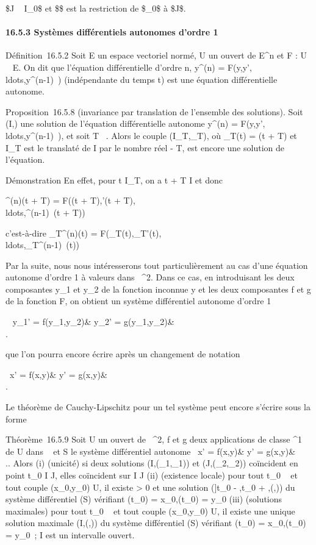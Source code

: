 \documentclass[]{article}
\begin{document}
\text\$J \subset~ I_0\$ et \$\psi\$ est la restriction
de \$\phi_0\$ à \$J\$.

\paragraph{16.5.3 Systèmes différentiels autonomes d'ordre 1}

Définition~16.5.2 Soit E un espace vectoriel normé, U un ouvert de
E^n et F : U \rightarrow~ E. On dit que l'équation différentielle
d'ordre n, y^(n) =
F(y,y',\\ldots,y^(n-1)~)
(indépendante du temps t) est une équation différentielle autonome.

Proposition~16.5.8 (invariance par translation de l'ensemble des
solutions). Soit (I,\phi) une solution de l'équation différentielle
autonome y^(n) =
F(y,y',\\ldots,y^(n-1)~),
et soit T \in {}~. Alors le couple (I_T,\phi_T), où
\phi_T(t) = \phi(t + T) et I_T est le translaté de I par le
nombre réel - T, est encore une solution de l'équation.

Démonstration En effet, pour t \in I_T, on a t + T \in I et donc

\phi^(n)(t + T) = F(\phi(t + T),\phi'(t +
T),\\ldots,\phi^(n-1)~(t
+ T))

c'est-à-dire \phi_T^(n)(t) =
F(\phi_T(t),\phi_T'(t),\\ldots,\phi_T^(n-1)~(t))

Par la suite, nous nous intéresserons tout particulièrement au cas d'une
équation autonome d'ordre 1 à valeurs dans ~^2. Dans ce cas,
en introduisant les deux composantes y_1 et y_2 de la
fonction inconnue y et les deux composantes f et g de la fonction F, on
obtient un système différentiel autonome d'ordre 1

\left \ \cases
y_1' = f(y_1,y_2)& \cr
y_2' = g(y_1,y_2)&\\ 
\right .

que l'on pourra encore écrire après un changement de notation

\left \ \cases x' =
f(x,y)& \cr y' = g(x,y)&\\  \right .

Le théorème de Cauchy-Lipschitz pour un tel système peut encore s'écrire
sous la forme

Théorème~16.5.9 Soit U un ouvert de ~^2, f et g deux
applications de classe ^1 de U dans ~ et S le système
différentiel autonome \left \
\cases x' = f(x,y)& \cr y' = g(x,y)&\\
 \right .. Alors (i) (unicité) si deux solutions
(I,(\phi_1,\psi_1)) et (J,(\phi_2,\psi_2))
coïncident en point t_0 \in I \bigcap J, elles coïncident sur I \bigcap J
(ii) (existence locale) pour tout t_0 \in \mathbb{R}~ et tout couple
(x_0,y_0) \in U, il existe \eta \textgreater{} 0 et une
solution ({]}t_0 - \eta,t_0 + \eta{[},(\phi,\psi)) du système
différentiel (S) vérifiant \phi(t_0) =
x_0,\psi(t_0) = y_0 (iii) (solutions maximales)
pour tout t_0 \in {}~ et tout couple (x_0,y_0) \in
U, il existe une unique solution maximale (I,(\phi,\psi)) du système
différentiel (S) vérifiant \phi(t_0) =
x_0,\psi(t_0) = y_0~; I est un intervalle
ouvert.
\end{document}
